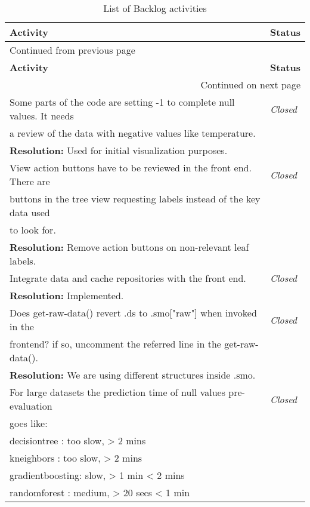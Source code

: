 \documentclass[a4paper]{article}
\begin{document}
\begin{longtable}{ll}
\caption{List of Backlog activities}
\\[0pt]
\hline
\textbf{Activity} & \textbf{Status}\\[0pt]
\hline
\endfirsthead
\multicolumn{2}{l}{Continued from previous page} \\[0pt]
\hline

\textbf{Activity} & \textbf{Status} \\[0pt]

\hline
\endhead
\hline\multicolumn{2}{r}{Continued on next page} \\
\endfoot
\endlastfoot
\hline
Some parts of the code are setting -1 to complete null values. It needs & \emph{Closed}\\[0pt]
a review of the data with negative values like temperature. & \\[0pt]
\textbf{Resolution:} Used for initial visualization purposes. & \\[0pt]
\hline
View action buttons have to be reviewed in the front end. There are & \emph{Closed}\\[0pt]
buttons in the tree view requesting labels instead of the key data used & \\[0pt]
to look for. & \\[0pt]
\textbf{Resolution:} Remove action buttons on non-relevant leaf labels. & \\[0pt]
\hline
Integrate data and cache repositories with the front end. & \emph{Closed}\\[0pt]
\textbf{Resolution:} Implemented. & \\[0pt]
\hline
Does get-raw-data() revert .ds to .smo["raw"] when invoked in the & \emph{Closed}\\[0pt]
frontend? if so, uncomment the referred line in the get-raw-data(). & \\[0pt]
\textbf{Resolution:} We are using different structures inside .smo. & \\[0pt]
\hline
For large datasets the prediction time of null values pre-evaluation & \emph{Closed}\\[0pt]
goes like: & \\[0pt]
decisiontree    : too slow,  >   2 mins & \\[0pt]
kneighbors      : too slow,  >   2 mins & \\[0pt]
gradientboosting: slow,      >   1 min  < 2 mins & \\[0pt]
randomforest    : medium,    >  20 secs < 1 min & \\[0pt]

\end{longtable}
\end{document}
